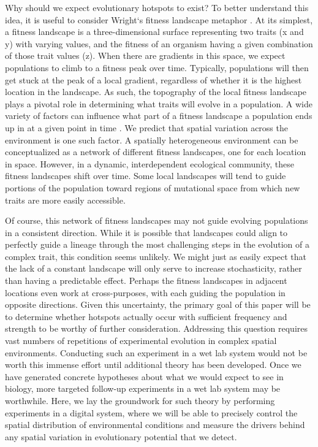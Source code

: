 Why should we expect evolutionary hotspots to exist? To better understand this idea, it is useful to consider Wright`s fitness landscape metaphor \citep{wright_roles_1932}. At its simplest, a fitness landscape is a three-dimensional surface representing two traits (x and y) with varying values, and the fitness of an organism having a given combination of those trait values (z). When there are gradients in this space, we expect populations to climb to a fitness peak over time. Typically, populations will then get stuck at the peak of a local gradient, regardless of whether it is the highest location in the landscape. As such, the topography of the local fitness landscape plays a pivotal role in determining what traits will evolve in a population. A wide variety of factors can influence what part of a fitness landscape a population ends up in at a given point in time \citep{wilke_evolution_2001}. We predict that spatial variation across the environment is one such factor. A spatially heterogeneous environment can be conceptualized as a network of different fitness landscapes, one for each location in space. However, in a dynamic, interdependent ecological community, these fitness landscapes shift over time. Some local landscapes will tend to guide portions of the population toward regions of mutational space from which new traits are more easily accessible.

Of course, this network of fitness landscapes may not guide evolving populations in a consistent direction. While it is possible that landscapes could align to perfectly guide a lineage through the most challenging steps in the evolution of a complex trait, this condition seems unlikely. We might just as easily expect that the lack of a constant landscape will only serve to increase stochasticity, rather than having a predictable effect. Perhaps the fitness landscapes in adjacent locations even work at cross-purposes, with each guiding the population in opposite directions. Given this uncertainty, the primary goal of this paper will be to determine whether hotspots actually occur with sufficient frequency and strength to be worthy of further consideration. Addressing this question requires vast numbers of repetitions of experimental evolution in complex spatial environments. Conducting such an experiment in a wet lab system would not be worth this immense effort until additional theory has been developed. Once we have generated concrete hypotheses about what we would expect to see in biology, more targeted follow-up experiments in a wet lab system may be worthwhile. Here, we lay the groundwork for such theory by performing experiments in a digital system, where we will be able to precisely control the spatial distribution of environmental conditions and measure the drivers behind any spatial variation in evolutionary potential that we detect.

